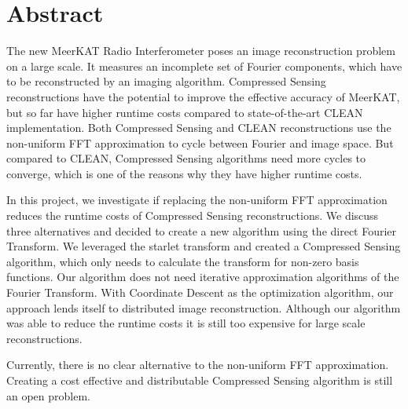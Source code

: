 \section*{Abstract}
The new MeerKAT Radio Interferometer poses an image reconstruction problem on a large scale. It measures an incomplete set of Fourier components, which have to be reconstructed by an imaging algorithm.  Compressed Sensing reconstructions have the potential to improve the effective accuracy of MeerKAT, but so far have higher runtime costs compared to state-of-the-art CLEAN implementation. Both Compressed Sensing and CLEAN reconstructions use the non-uniform FFT approximation to cycle between Fourier and image space. But compared to CLEAN, Compressed Sensing algorithms need more cycles to converge, which is one of the reasons why they have higher runtime costs.

In this project, we investigate if replacing the non-uniform FFT approximation reduces the runtime costs of Compressed Sensing reconstructions. We discuss three alternatives and decided to create a new algorithm using the direct Fourier Transform. We leveraged the starlet transform and created a Compressed Sensing algorithm, which only needs to calculate the transform for non-zero basis functions. Our algorithm does not need iterative approximation algorithms of the Fourier Transform. With Coordinate Descent as the optimization algorithm, our approach lends itself to distributed image reconstruction. Although our algorithm was able to reduce the runtime costs it is still too expensive for large scale reconstructions.

Currently, there is no clear alternative to the non-uniform FFT approximation. Creating a cost effective and distributable Compressed Sensing algorithm is still an open problem.